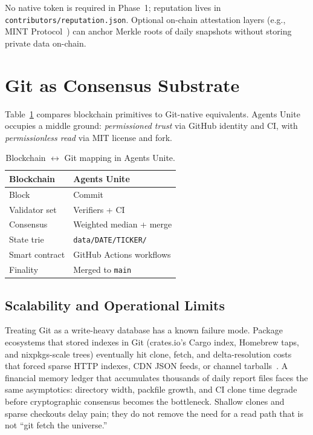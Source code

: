 \documentclass[10pt,twocolumn]{article}
\begin{document}
No native token is required in Phase~1; reputation lives in \texttt{contributors/reputation.json}. Optional on-chain attestation layers (e.g., MINT Protocol~\cite{mint}) can anchor Merkle roots of daily snapshots without storing private data on-chain.

\section{Git as Consensus Substrate}
\label{sec:git-substrate}

Table~\ref{tab:git-blockchain} compares blockchain primitives to Git-native equivalents. Agents Unite occupies a middle ground: \emph{permissioned trust} via GitHub identity and CI, with \emph{permissionless read} via MIT license and fork.

\begin{table}[h]
\centering
\caption{Blockchain $\leftrightarrow$ Git mapping in Agents Unite.}
\label{tab:git-blockchain}
\small
\begin{tabular}{@{}>{\raggedright\arraybackslash}p{}>{\raggedright\arraybackslash}p{}@{}}
\toprule
\textbf{Blockchain} & \textbf{Agents Unite} \\
\midrule
Block & Commit \\
Validator set & Verifiers + CI \\
Consensus & Weighted median + merge \\
State trie & \texttt{data/DATE/TICKER/} \\
Smart contract & GitHub Actions workflows \\
Finality & Merged to \texttt{main} \\
\bottomrule
\end{tabular}
\end{table}

\subsection{Scalability and Operational Limits}
\label{sec:scalability}

Treating Git as a write-heavy database has a known failure mode. Package ecosystems that stored indexes in Git (crates.io's Cargo index, Homebrew taps, and nixpkgs-scale trees) eventually hit clone, fetch, and delta-resolution costs that forced sparse HTTP indexes, CDN JSON feeds, or channel tarballs~\cite{nesbitt2025}. A financial memory ledger that accumulates thousands of daily report files faces the same asymptotics: directory width, packfile growth, and CI clone time degrade before cryptographic consensus becomes the bottleneck. Shallow clones and sparse checkouts delay pain; they do not remove the need for a read path that is not ``git fetch the universe.''
\end{document}
